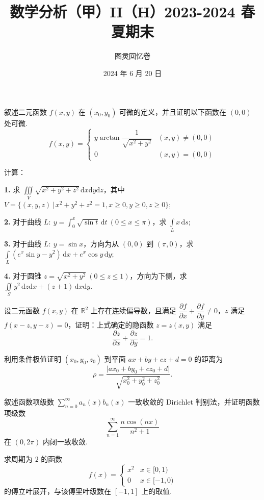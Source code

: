 \documentclass[UTF8,14pt,normal]{ctexart}
\title{\vspace{-4em}\textbf{数学分析（甲）II（H）2023-2024 春夏期末}}
\author{图灵回忆卷}
\date{2024 年 6 月 20 日}
\begin{document}
\maketitle

 叙述二元函数 $f(x, y)$ 在 $(x_0, y_0)$ 可微的定义，并且证明以下函数在 $(0, 0)$ 处可微. \[f(x, y) = \begin{cases}
    y\arctan\dfrac{1}{\sqrt{x^2 + y^2}}  & (x, y) \neq (0, 0)\\
    0                                    & (x, y) = (0, 0)
\end{cases}\]

 计算：

\textbf{1.} 求 $\displaystyle\iiint\limits_{V}\sqrt{x^2 + y^2 + z^2}\,\mathrm{d}x\mathrm{d}y\mathrm{d}z$，其中 $V = \{(x, y, z)\,\vert\, x^2 + y^2 + z^2 = 1, x\geqslant 0, y\geqslant 0, z\geqslant 0\}$;

\textbf{2.} 对于曲线 $L:\ y = \displaystyle\int_0^x\sqrt{\sin t}\,\mathrm{d}t\ (0\leqslant x\leqslant \pi)$，求 $\displaystyle\int\limits_Lx\,\mathrm{d}s$;

\textbf{3.} 对于曲线 $L:\ y = \sin x$，方向为从 $(0, 0)$ 到 $(\pi, 0)$，求 $\displaystyle\int\limits_L(e^x\sin y-y^2)\,\mathrm{d}x + e^x\cos{y}\, \mathrm{d}y$;

\textbf{4.} 对于圆锥 $z = \sqrt{x^2 + y^2}\ (0\leqslant z\leqslant 1)$，方向为下侧，求 $\displaystyle\iint\limits_{S}y^2\,\mathrm{d}z\mathrm{d}x + (z + 1)\,\mathrm{d}x\mathrm{d}y$.

 设二元函数 $f(x, y)$ 在 $\mathbb{R}^2$ 上存在连续偏导数，且满足 $\dfrac{\partial f}{\partial x} + \dfrac{\partial f}{\partial y} \neq 0$，$z$ 满足 $f(x - z, y - z) = 0$，证明：上式确定的隐函数 $z = z(x, y)$ 满足 \[\dfrac{\partial z}{\partial x} + \dfrac{\partial z}{\partial y} = 1.\]

 利用条件极值证明 $(x_0, y_0, z_0)$ 到平面 $ax + by + cz + d = 0$ 的距离为 \[\rho = \dfrac{\lvert ax_0 + by_0 + cz_0 + d\rvert}{\sqrt{x_0^2 + y_0^2 + z_0^2}}.\]

 叙述函数项级数 $\displaystyle\sum\limits_{n=0}^{\infty} a_n(x)b_n(x)$ 一致收敛的 Dirichlet 判别法，并证明函数项级数 \[\sum_{n=1}^{\infty} \dfrac{n\cos(nx)}{n^2+1}\] 在 $(0, 2\pi)$ 内闭一致收敛.

 求周期为 $2$ 的函数 \[f(x) = \begin{cases}
    x^2   & x\in [0 , 1) \\
    0     & x\in [-1, 0)
\end{cases}\] 的傅立叶展开，与该傅里叶级数在 $[-1, 1]$ 上的取值.
\end{document}
